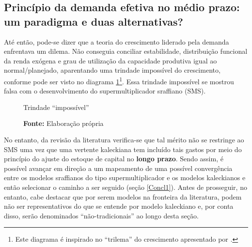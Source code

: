 \subsection{Princípio da demanda efetiva no médio prazo: um paradigma e duas alternativas?}
\label{Medium}

Até então, pode-se dizer que a teoria do crescimento liderado pela demanda enfrentava um dilema. Não conseguia conciliar estabilidade, distribuição funcional da renda exógena e grau de utilização da capacidade produtiva igual ao normal/planejado, aparentando uma trindade impossível do crescimento, conforme pode ser visto no diagrama \ref{diagrama}\footnote{Este diagrama é inspirado no ``trilema'' do crescimento apresentado por \textcite{cesaratto_neo-kaleckian_2015}.}.
Essa trindade impossível se mostrou falsa com o desenvolvimento do supermultiplicador sraffiano (SMS).


\begin{figure}[htb]
	\caption{Trindade ``impossível''}
	\label{diagrama}
	\begin{center}
	\end{center}
	\caption*{\textbf{Fonte:} Elaboração própria}
\end{figure}
No entanto, da revisão da literatura verifica-se que tal mérito não se restringe ao SMS uma vez que uma vertente kaleckiana tem incluído tais gastos por meio do princípio do ajuste do estoque de capital no \textbf{longo prazo}.
Sendo assim, é possível avançar em direção a um mapeamento de uma possível convergência entre os modelos sraffianos do tipo supermultiplicador e os modelos kaleckianos e então selecionar o caminho a ser seguido (seção \ref{Concl1}).
Antes de prosseguir, no entanto, cabe destacar que por serem modelos na fronteira da literatura, podem não ser representativos do que se entende por modelo kaleckiano e, por conta disso, serão denominados ``não-tradicionais'' ao longo desta seção.


